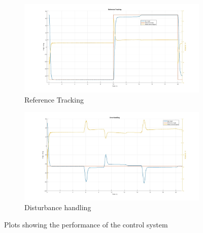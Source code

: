 \begin{figure}
    \centering
    \begin{subfigure}{0.45\textwidth}
        \includegraphics[width=\textwidth]{Figs/Reference Tracking.jpg} 
        \caption{Reference Tracking}
        \label{fig: Reference Tracking} 
    \end{subfigure}
    \hfill
    \begin{subfigure}{0.45\textwidth}
        \includegraphics[width=\textwidth]{Figs/Error handling.jpg} 
        \caption{Disturbance handling}
        \label{fig: Disturbance Handling}
    \end{subfigure}
    \caption{Plots showing the performance of the control system}
    \label{fig: Performance Plots}
\end{figure}
